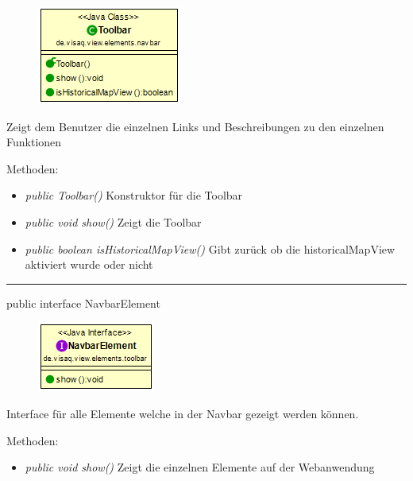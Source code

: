 \begin{minipage}{0.3\textwidth}
    \begin{figure}[H]
        \includegraphics[scale = 0.6]{media/frontend/view/de.view.elements.navbar/ToolbarClass.png}
    \end{figure}
    \end{minipage} \hfill
    \begin{minipage}{0.6\textwidth}
Zeigt dem Benutzer die einzelnen Links und Beschreibungen zu den einzelnen Funktionen
\end{minipage}

Methoden:
\begin{itemize}
    \item \emph{public Toolbar()} Konstruktor für die Toolbar
    \item \emph{public void show()} Zeigt die Toolbar
    \item \emph{public boolean isHistoricalMapView()} Gibt zurück ob die historicalMapView aktiviert wurde oder nicht
\end{itemize}

\rule{\textwidth}{0.4pt}
public interface NavbarElement

\begin{minipage}{0.3\textwidth}
    \begin{figure}[H]
        \includegraphics[scale = 0.7]{media/frontend/view/de.view.elements.navbar/NavbarElementClass.png}
    \end{figure}
\end{minipage} \hfill
\begin{minipage}{0.6\textwidth}
Interface für alle Elemente welche in der Navbar gezeigt werden können.
\end{minipage}

Methoden:
\begin{itemize}
    \item \emph{public void show()} Zeigt die einzelnen Elemente auf der Webanwendung
\end{itemize}
